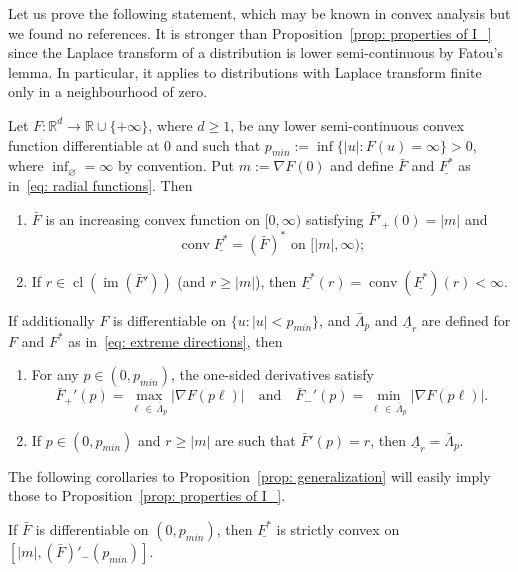 \documentclass[AHL,Unicode,published]{cedram}
\DeclareMathOperator{\conv}{conv}
\DeclareMathOperator{\im}{im}
\DeclareMathOperator{\cl}{cl}
\newcommand{\ubar}[1]{\underline{#1}}
\newcommand{\Rbb}{\mathbb{R}}
\newcommand*{\alphenumi}{\renewcommand*{\theenumi}{\alph{enumi}}}
\begin{document}
Let us prove the following statement, which may be known in convex analysis but we found no references. It is stronger than Proposition~\ref{prop: properties of I_} since the Laplace transform of a distribution is lower semi-continuous by Fatou's lemma. In particular, it applies to distributions with Laplace transform finite only in a neighbourhood of zero.

\begin{prop}\label{prop: generalization}
Let $F: \Rbb^d \to \Rbb \cup \{+ \infty \}$, where $d \ge 1$, be any lower semi-continuous convex function differentiable at $0$ and such that $p_{min}:= \inf\{|u|: F(u)=\infty \}>0$, where $\inf_\varnothing=\infty$ by convention. Put $m:= \nabla F(0)$ and define $\bar F$ and $\ubar{F^*}$ as in~\eqref{eq: radial functions}. Then
\begin{enumerate}\alphenumi
\item \label{item': conv I_ =}
$\bar F$ is an increasing convex function on $[0, \infty)$ satisfying $\bar F'_+(0)=|m|$ and
\[
\conv \ubar {F^*} = (\bar{F})^* \text{ on }[|m|, \infty);
\]
\item \label{item': I_=conv I_}
If $r \in \cl (\im(\bar{F}'))$ (and $r \ge |m|$), then $\ubar {F^*}(r) = \conv (\ubar {F^*})(r)<\infty$.
\end{enumerate}

If additionally $F$ is differentiable on $\{u: |u|<p_{min}\}$, and $\bar{\Lambda}_p$ and $\ubar{\Lambda}_r$ are defined for $F$ and $F^*$ as in~\eqref{eq: extreme directions}, then
\begin{enumerate}\alphenumi
\setcounter{enumi}{2}
\item \label{item': differentiable}
For any $p \in (0,p_{min})$, the one-sided derivatives satisfy
\[
\bar F_+'(p) = \max_{\ell\,\in\,\bar{\Lambda}_p}\left|\nabla F(p \ell)\right| \quad \text{and} \quad \bar F_-'(p) = \min_{\ell\,\in\,\bar{\Lambda}_p }\left|\nabla F (p \ell)\right|.
\]
\item \label{item': Lambdas}
If $p \in (0,p_{min})$ and $r \ge |m|$ are such that $\bar{F}'(p)=r$, then $\ubar{\Lambda}_r = \bar{\Lambda}_p$.
\end{enumerate}
\end{prop}

The following corollaries to Proposition~\ref{prop: generalization} will easily imply those to Proposition~\ref{prop: properties of I_}.

\begin{coro} \label{cor': L differentiable}
If $\bar F$ is differentiable on $(0, p_{min})$, then $\ubar {F^*}$ is strictly convex on $[|m|, (\bar F)'_-(p_{min})]$.
\end{coro}
\end{document}
